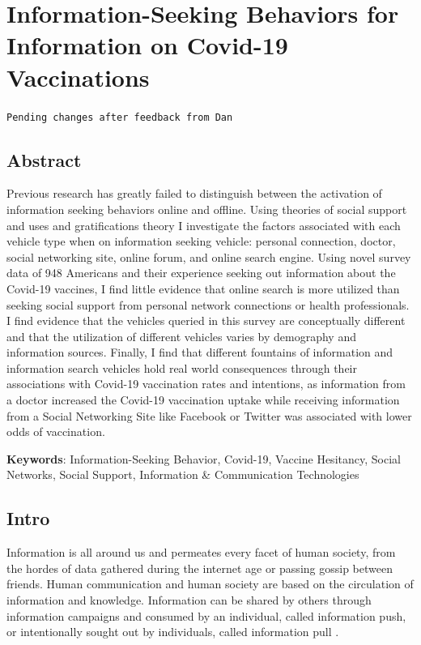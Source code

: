 \hypertarget{paper-2}{%
\chapter{Information-Seeking Behaviors for Information on Covid-19 Vaccinations}\label{paper-2}}

\begin{center}
    \texttt{Pending changes after feedback from Dan} %
\end{center}


\hypertarget{abstract}{%
\section{Abstract}\label{abstract}}

Previous research has greatly failed to distinguish between the activation of
information seeking behaviors online and offline. Using theories of social
support and uses and gratifications theory I investigate the factors associated
with each vehicle type when on information seeking vehicle: personal connection,
doctor, social networking site, online forum, and online search engine. Using
novel survey data of 948 Americans and their experience seeking out
information about the Covid-19 vaccines, I find little evidence that online
search is more utilized than seeking social support from personal network
connections or health professionals. I find evidence that the vehicles queried
in this survey are conceptually different and that the utilization of different
vehicles varies by demography and information sources. Finally, I find that
different fountains of information and information search vehicles hold real
world consequences through their associations with Covid-19 vaccination rates
and intentions, as information from a doctor increased the Covid-19 vaccination
uptake while receiving information from a Social Networking Site like Facebook
or Twitter was associated with lower odds of vaccination.

\textbf{Keywords}: Information-Seeking Behavior, Covid-19, Vaccine Hesitancy, Social Networks, Social Support, Information \& Communication Technologies

\hypertarget{intro-1}{%
\section{Intro}\label{intro-1}}

Information is all around us and permeates every facet of human society, from
the hordes of data gathered during the internet age or passing gossip between
friends. Human communication and human society are based on the circulation of
information and knowledge. Information can be shared by others through
information campaigns and consumed by an individual, called information push, or
intentionally sought out by individuals, called information pull
\citep{cybenkoFoundationsInformationPush1999}.

